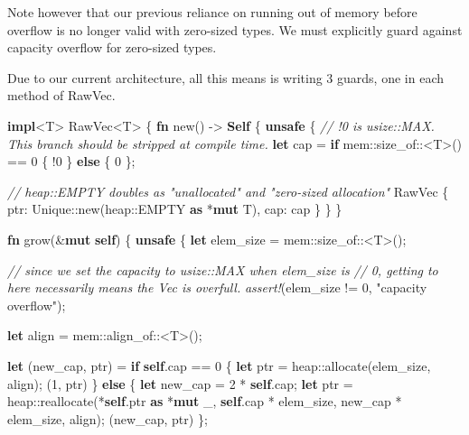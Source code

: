 \documentclass[a4paper,]{book}
\newenvironment{Shaded}{\begin{snugshade}}{\end{snugshade}}
\newcommand{\KeywordTok}[1]{\textcolor[rgb]{0.13,0.29,0.53}{\textbf{{#1}}}}
\newcommand{\DecValTok}[1]{\textcolor[rgb]{0.00,0.00,0.81}{{#1}}}
\newcommand{\StringTok}[1]{\textcolor[rgb]{0.31,0.60,0.02}{{#1}}}
\newcommand{\CommentTok}[1]{\textcolor[rgb]{0.56,0.35,0.01}{\textit{{#1}}}}
\newcommand{\PreprocessorTok}[1]{\textcolor[rgb]{0.56,0.35,0.01}{\textit{{#1}}}}
\newcommand{\NormalTok}[1]{{#1}}
\begin{document}
Note however that our previous reliance on running out of memory before
overflow is no longer valid with zero-sized types. We must explicitly
guard against capacity overflow for zero-sized types.

Due to our current architecture, all this means is writing 3 guards, one
in each method of RawVec.

\begin{Shaded}
\begin{Highlighting}[]
\KeywordTok{impl}\NormalTok{<T> RawVec<T> \{}
    \KeywordTok{fn} \NormalTok{new() -> }\KeywordTok{Self} \NormalTok{\{}
        \KeywordTok{unsafe} \NormalTok{\{}
            \CommentTok{// !0 is usize::MAX. This branch should be stripped at compile time.}
            \KeywordTok{let} \NormalTok{cap = }\KeywordTok{if} \NormalTok{mem::size_of::<T>() == }\DecValTok{0} \NormalTok{\{ !}\DecValTok{0} \NormalTok{\} }\KeywordTok{else} \NormalTok{\{ }\DecValTok{0} \NormalTok{\};}

            \CommentTok{// heap::EMPTY doubles as "unallocated" and "zero-sized allocation"}
            \NormalTok{RawVec \{ ptr: Unique::new(heap::EMPTY }\KeywordTok{as} \NormalTok{*}\KeywordTok{mut} \NormalTok{T), cap: cap \}}
        \NormalTok{\}}
    \NormalTok{\}}

    \KeywordTok{fn} \NormalTok{grow(&}\KeywordTok{mut} \KeywordTok{self}\NormalTok{) \{}
        \KeywordTok{unsafe} \NormalTok{\{}
            \KeywordTok{let} \NormalTok{elem_size = mem::size_of::<T>();}

            \CommentTok{// since we set the capacity to usize::MAX when elem_size is}
            \CommentTok{// 0, getting to here necessarily means the Vec is overfull.}
            \PreprocessorTok{assert!}\NormalTok{(elem_size != }\DecValTok{0}\NormalTok{, }\StringTok{"capacity overflow"}\NormalTok{);}

            \KeywordTok{let} \NormalTok{align = mem::align_of::<T>();}

            \KeywordTok{let} \NormalTok{(new_cap, ptr) = }\KeywordTok{if} \KeywordTok{self}\NormalTok{.cap == }\DecValTok{0} \NormalTok{\{}
                \KeywordTok{let} \NormalTok{ptr = heap::allocate(elem_size, align);}
                \NormalTok{(}\DecValTok{1}\NormalTok{, ptr)}
            \NormalTok{\} }\KeywordTok{else} \NormalTok{\{}
                \KeywordTok{let} \NormalTok{new_cap = }\DecValTok{2} \NormalTok{* }\KeywordTok{self}\NormalTok{.cap;}
                \KeywordTok{let} \NormalTok{ptr = heap::reallocate(*}\KeywordTok{self}\NormalTok{.ptr }\KeywordTok{as} \NormalTok{*}\KeywordTok{mut} \NormalTok{_,}
                                            \KeywordTok{self}\NormalTok{.cap * elem_size,}
                                            \NormalTok{new_cap * elem_size,}
                                            \NormalTok{align);}
                \NormalTok{(new_cap, ptr)}
            \NormalTok{\};}


\end{Highlighting}
\end{Shaded}
\end{document}

